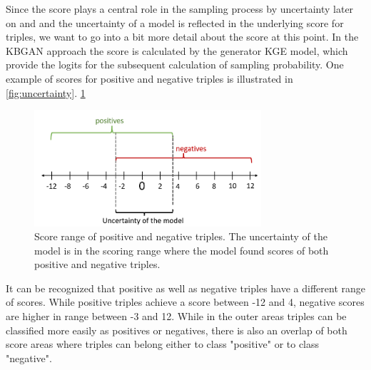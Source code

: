 Since the score plays a central role in the sampling process by uncertainty later on and and the uncertainty of a model is reflected in the underlying score for triples, we want to go into a bit more detail about the score at this point.
In the KBGAN approach the score is calculated by the generator \ac{KGE} model, which provide the logits for the subsequent calculation of sampling probability.
One example of scores for positive and negative triples is illustrated in \autoref{fig:uncertainty}.
\ref{fig:uncertainty}
\begin{figure}[t]
  \centering
    \includegraphics[width=0.75\textwidth]{figures/uncertainty.PNG}
  \caption{Score range of positive and negative triples.
  The uncertainty of the model is in the scoring range where the model found scores of both positive and negative triples.}
  \label{fig:uncertainty}
\end{figure}
It can be recognized that positive as well as negative triples have a different range of scores.
While positive triples achieve a score between -12 and 4, negative scores are higher in range between -3 and 12.
While in the outer areas triples can be classified more easily as positives or negatives, there is also an overlap of both score areas where triples can belong either to class "positive" or to class "negative".










